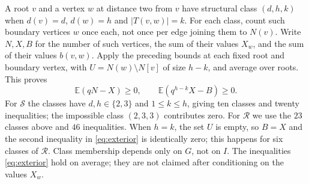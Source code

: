 \documentclass[11pt]{article}
\newcommand{\E}{\mathbb E}\newcommand{\Prob}{\mathbb P}
\begin{document}
A root $v$ and a vertex $w$ at distance two from $v$ have structural class $(d,h,k)$ when $d(v)=d$, $d(w)=h$ and $|T(v,w)|=k$. For each class, count such boundary vertices $w$ once each, not once per edge joining them to $N(v)$. Write $N,X,B$ for the number of such vertices, the sum of their values $X_w$, and the sum of their values $b(v,w)$. Apply the preceding bounds at each fixed root and boundary vertex, with $U=N(w)\setminus N[v]$ of size $h-k$, and average over roots. This proves
\begin{equation}\label{eq:exterior}
 \E(qN-X)\ge0,\qquad \E(q^{h-k}X-B)\ge0.
\end{equation}
For $\mathcal S$ the classes have $d,h\in\{2,3\}$ and $1\le k\le h$, giving ten classes and twenty inequalities; the impossible class $(2,3,3)$ contributes zero. For $\mathcal R$ we use the $23$ classes above and $46$ inequalities. When $h=k$, the set $U$ is empty, so $B=X$ and the second inequality in \eqref{eq:exterior} is identically zero; this happens for six classes of $\mathcal R$. Class membership depends only on $G$, not on $I$. The inequalities \eqref{eq:exterior} hold on average; they are not claimed after conditioning on the values $X_w$.
\end{document}
